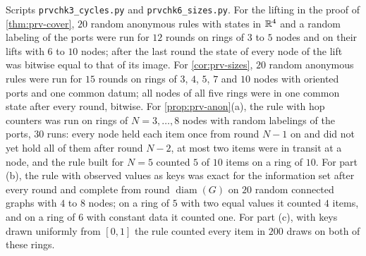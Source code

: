 \begin{numcheck}\label{chk:prv-anon}
Scripts \texttt{prvchk3\_cycles.py} and \texttt{prvchk6\_sizes.py}. For the lifting in the proof of \cref{thm:prv-cover}, $20$ random anonymous rules with states in $\mathbb{R}^4$ and a random labeling of the ports were run for $12$ rounds on rings of $3$ to $5$ nodes and on their lifts with $6$ to $10$ nodes; after the last round the state of every node of the lift was bitwise equal to that of its image. For \cref{cor:prv-sizes}, $20$ random anonymous rules were run for $15$ rounds on rings of $3$, $4$, $5$, $7$ and $10$ nodes with oriented ports and one common datum; all nodes of all five rings were in one common state after every round, bitwise. For \cref{prop:prv-anon}(a), the rule with hop counters was run on rings of $N=3,\dots,8$ nodes with random labelings of the ports, $30$ runs: every node held each item once from round $N-1$ on and did not yet hold all of them after round $N-2$, at most two items were in transit at a node, and the rule built for $N=5$ counted $5$ of $10$ items on a ring of $10$. For part (b), the rule with observed values as keys was exact for the information set after every round and complete from round $\operatorname{diam}(G)$ on $20$ random connected graphs with $4$ to $8$ nodes; on a ring of $5$ with two equal values it counted $4$ items, and on a ring of $6$ with constant data it counted one. For part (c), with keys drawn uniformly from $[0,1]$ the rule counted every item in $200$ draws on both of these rings.
\end{numcheck}

